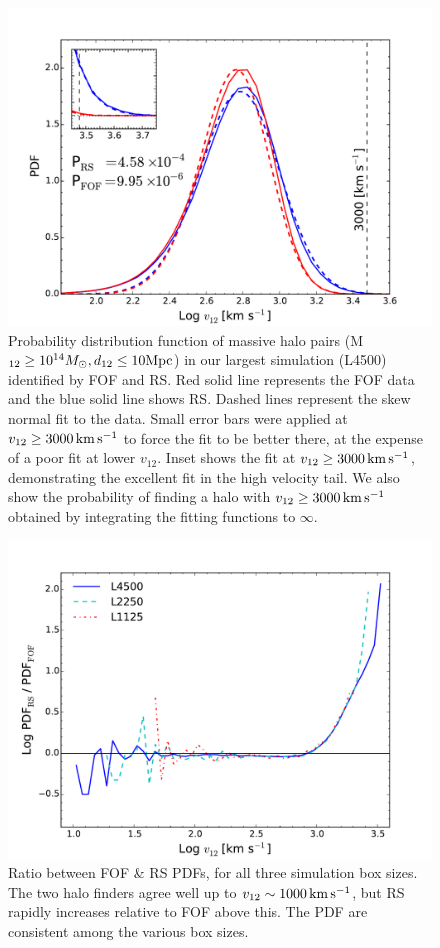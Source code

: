 \documentclass[useAMS, usenatbib]{mn2e}
\newcommand{\Msun}{M_{\odot}}
\newcommand{\vonetwo}{v_{12}}
\newcommand{\kms}{\,\rm{km}\,\rm{s}^{-1}}
\begin{document}
\begin{figure}
\includegraphics[scale=0.45]{figure3.pdf}
\caption{Probability distribution function of massive halo pairs (M$_{12}\geq10^{14}\Msun, d_{12}\leq10\rm{Mpc}$) in our
largest simulation (L4500) identified by FOF and RS.  Red solid line represents
the FOF data and the blue solid line shows RS.  Dashed lines represent
the skew normal fit to the data.  Small error bars were applied at
$\vonetwo\geq 3000\kms$ to force the fit to be better there, at
the expense of a poor fit at lower $\vonetwo$.
Inset shows the fit at $\vonetwo\geq3000\kms$,
demonstrating the excellent fit in the high velocity tail.  We
also show the probability of finding a halo with $\vonetwo\geq 3000\kms$
obtained by integrating the fitting functions to $\infty$.
}
\label{fig:PDF}
\end{figure}

\begin{figure}
\includegraphics[scale=0.45]{figure4.pdf}
\caption{Ratio between FOF \& RS PDFs, for all three simulation box sizes.
The two halo finders agree well up to $\vonetwo\sim 1000\kms$, but
RS rapidly increases relative to FOF above this.  The PDF are consistent
among the various box sizes.}
\label{fig:PDFdiff}
\end{figure}
\end{document}
